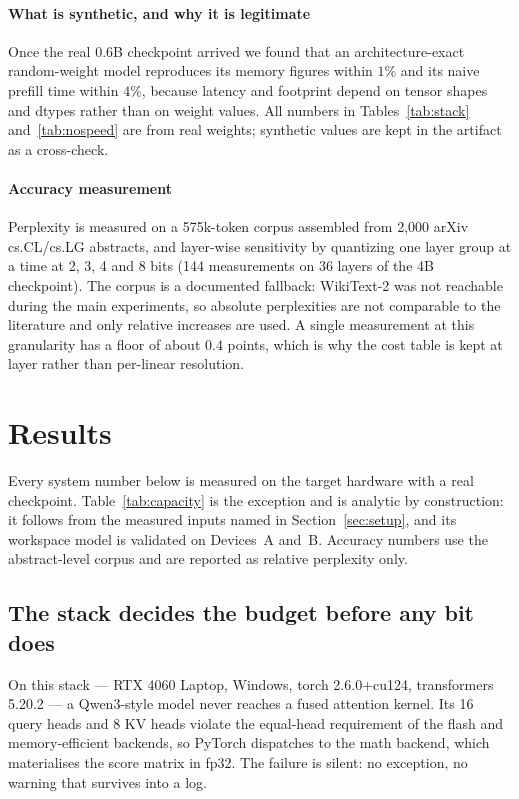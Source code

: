 \documentclass[10pt,journal]{IEEEtran}
\begin{document}
\paragraph*{What is synthetic, and why it is legitimate}
Once the real 0.6B checkpoint arrived we found that an architecture-exact
random-weight model reproduces its memory figures within $1\%$ and its naive
prefill time within $4\%$, because latency and footprint depend on tensor shapes
and dtypes rather than on weight values. All numbers
in Tables~\ref{tab:stack} and~\ref{tab:nospeed} are from real weights; synthetic
values are kept in the artifact as a cross-check.

\paragraph*{Accuracy measurement}
Perplexity is measured on a 575k-token corpus assembled from 2{,}000 arXiv
cs.CL/cs.LG abstracts, and layer-wise sensitivity by quantizing one layer group
at a time at 2, 3, 4 and 8 bits (144 measurements on 36 layers of the 4B
checkpoint). The corpus is a documented fallback: WikiText-2 was not reachable
during the main experiments, so absolute perplexities are not comparable to the
literature and only relative increases are used. A single measurement at this
granularity has a floor of about $0.4$ points, which is why the cost table is
kept at layer rather than per-linear resolution.

\section{Results}
\label{sec:results}

Every system number below is measured on the target hardware with a real
checkpoint. Table~\ref{tab:capacity} is the exception and is analytic by
construction: it follows from the measured inputs named in
Section~\ref{sec:setup}, and its workspace model is validated on Devices~A and~B.
Accuracy numbers use the abstract-level corpus and are reported as relative
perplexity only.

\subsection{The stack decides the budget before any bit does}
\label{sec:results-stack}

On this stack --- RTX 4060 Laptop, Windows, torch 2.6.0+cu124, transformers
5.20.2 --- a Qwen3-style model never reaches a fused attention kernel. Its 16
query heads and 8 KV heads violate the equal-head requirement of the flash and
memory-efficient backends, so PyTorch dispatches to the math backend, which
materialises the score matrix in fp32. The failure is silent: no exception, no
warning that survives into a log.
\end{document}
